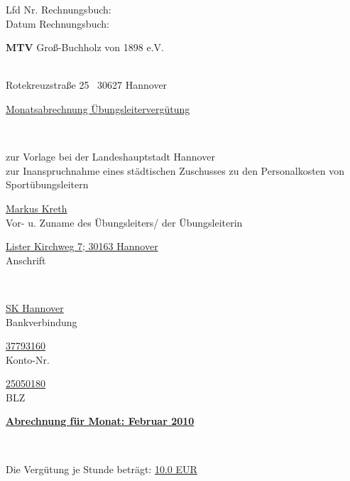 \documentclass[a4paper,10pt,BCOR=0mm]{scrreprt}
\begin{document}
\begin{flushright}
\parbox{6cm}{Lfd Nr. Rechnungsbuch: \hrulefill \\
Datum Rechnungsbuch: \hrulefill }
\end{flushright}
\begin{center}
\begin{Large}\textbf{MTV} Groß-Buchholz von 1898 e.V.                                        \end{Large}\\
Rotekreuzstraße 25 \textperiodcentered\ 30627 Hannover\\[.4cm]
\begin{huge}\underline{Monatsabrechnung Übungsleitervergütung}\end{huge}\\
\begin{scriptsize}zur Vorlage bei der Landeshauptstadt Hannover\\
zur Inanspruchnahme eines städtischen Zuschusses zu den Personalkosten von Sportübungsleitern\\[.7cm]
\end{scriptsize}

\parbox{0,49\textwidth}{
\begin{center}
\hrulefill\underline{Markus Kreth}\hrulefill\\
Vor- u. Zuname des Übungsleiters/ der Übungsleiterin
\end{center}
}
\hfill
\parbox{0,49\textwidth}{\begin{center}
\hrulefill\underline{Lister Kirchweg 7; 30163 Hannover}\hrulefill\\
Anschrift\end{center}}\\[.7cm]
\parbox{0,32\textwidth}{
\begin{center}
\hrulefill\underline{SK Hannover}\hrulefill\\
Bankverbindung
\end{center}
}
\hfill
\parbox{0,32\textwidth}{
\begin{center}
\hrulefill\underline{37793160}\hrulefill\\
Konto-Nr.
\end{center}
}
\hfill
\parbox{0,32\textwidth}{
\begin{center}
\hrulefill\underline{25050180}\hrulefill\\
BLZ
\end{center}
}
\parbox{12cm}{\begin{large}\underline{\textbf{Abrechnung für Monat: Februar 2010}}\end{large}}\\
\parbox{9cm}{Die Vergütung je Stunde beträgt: \underline{10.0 EUR}}
\end{center}\begin{flushright}


\end{flushright}
\end{document}
